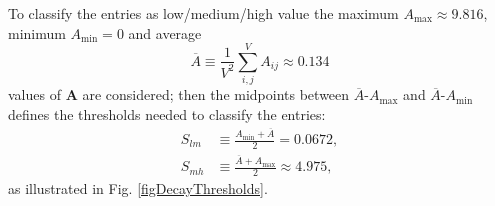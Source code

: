 \documentclass{article}
\begin{document}
                To classify the entries as low/medium/high value the maximum $A_{\max}\approx9.816$, minimum $A_{\min}=0$ and average
                \begin{equation*}
                    \overline A\equiv\frac1{V^2}\sum_{i,j}^VA_{ij}
                    \approx0.134
                \end{equation*}
                values of $\mathbf A$ are considered; then the midpoints between $\overline A$-$A_{\max}$ and $\overline A$-$A_{\min}$ defines the thresholds needed to classify the entries:
                \begin{equation}
                    \begin{split}
                        S_{lm}&\equiv\frac{A_{\min}+\overline A}2
                        =\num[scientific-notation=true]{0.0672},\\
                        S_{mh}&\equiv\frac{\overline A+A_{\max}}2
                        \approx4.975,
                    \end{split}
                    \label{eqDecayThresholds}
                \end{equation}
                as illustrated in Fig. \ref{figDecayThresholds}.
\end{document}
